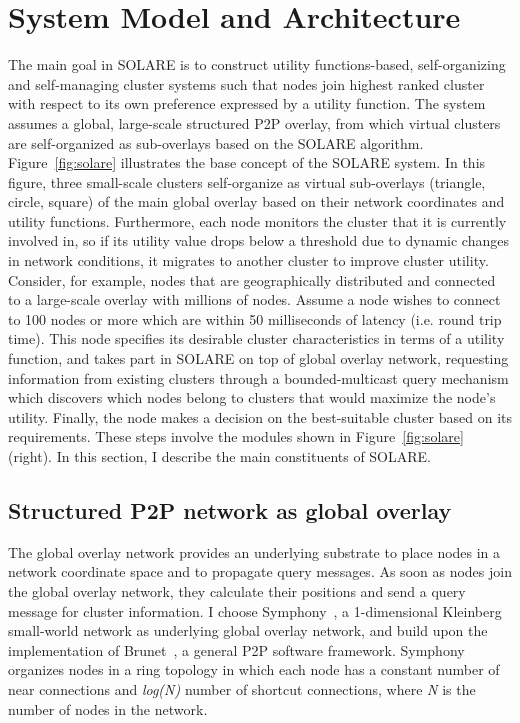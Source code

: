 \section{System Model and Architecture}
\label{solare:architecture}
The main goal in SOLARE is to construct utility functions-based,
self-organizing and self-managing cluster systems such that nodes join
highest ranked cluster with respect to its own preference expressed by a
utility function.
%
The system assumes a global, large-scale structured P2P overlay, from
which virtual clusters are self-organized as sub-overlays based on the
SOLARE algorithm.\\
%
Figure~\ref{fig:solare} illustrates the base concept of the SOLARE
system.
%
In this figure, three small-scale clusters self-organize as virtual
sub-overlays (triangle, circle, square) of the main global overlay based
on their network coordinates and utility functions.
%
Furthermore, each node monitors the cluster that it is currently
involved in, so if its utility value drops below a threshold due to
dynamic changes in network conditions, it migrates to another cluster to
improve cluster utility.
%
Consider, for example, nodes that are geographically distributed and
connected to a large-scale overlay with millions of nodes.
%
Assume a node wishes to connect to 100 nodes or more which are within 50
milliseconds of latency (i.e. round trip time).
%
This node specifies its desirable cluster characteristics in terms of a
utility function, and takes part in SOLARE on top of global overlay
network, requesting information from existing clusters through a
bounded-multicast query mechanism which discovers which nodes belong to
clusters that would maximize the node's utility.
%
Finally, the node makes a decision on the best-suitable cluster based on
its requirements.
%
These steps involve the modules shown in Figure~\ref{fig:solare}
(right).
%
In this section, I describe the main constituents of SOLARE.
%

\subsection{Structured P2P network as global overlay}
\label{solare:global}
The global overlay network provides an underlying substrate to place
nodes in a network coordinate space and to propagate query messages.
%
As soon as nodes join the global overlay network, they calculate their
positions and send a query message for cluster information.
%
I choose Symphony~\cite{symphony}, a 1-dimensional Kleinberg small-world network as
underlying global overlay network, and build upon the implementation of
Brunet~\cite{brunet}, a general P2P software framework.
%
Symphony organizes nodes in a ring topology in which each node has a
constant number of near connections and \textit{log(N)} number of
shortcut connections, where \textit{N} is the number of nodes in the
network.

